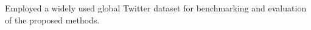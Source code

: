 Employed a widely used global Twitter dataset for benchmarking and evaluation of the proposed methods.
